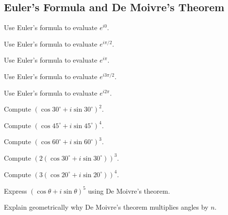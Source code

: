 \subsection*{Euler's Formula and De Moivre's Theorem}
\begin{exercise}
Use Euler's formula to evaluate $e^{i0}$.
\end{exercise}
\begin{exercise}
Use Euler's formula to evaluate $e^{i\pi/2}$.
\end{exercise}
\begin{exercise}
Use Euler's formula to evaluate $e^{i\pi}$.
\end{exercise}
\begin{exercise}
Use Euler's formula to evaluate $e^{i3\pi/2}$.
\end{exercise}
\begin{exercise}
Use Euler's formula to evaluate $e^{i2\pi}$.
\end{exercise}
\begin{exercise}
Compute $(\cos30^\circ+i\sin30^\circ)^2$.
\end{exercise}
\begin{exercise}
Compute $(\cos45^\circ+i\sin45^\circ)^4$.
\end{exercise}
\begin{exercise}
Compute $(\cos60^\circ+i\sin60^\circ)^3$.
\end{exercise}
\begin{exercise}
Compute $\left(2(\cos30^\circ+i\sin30^\circ)\right)^3$.
\end{exercise}
\begin{exercise}
Compute $\left(3(\cos20^\circ+i\sin20^\circ)\right)^4$.
\end{exercise}
\begin{exercise}
Express $(\cos\theta+i\sin\theta)^5$ using De Moivre's theorem.
\end{exercise}
\begin{exercise}
Explain geometrically why De Moivre's theorem multiplies angles by $n$.
\end{exercise}

